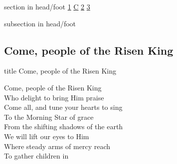 \documentclass{beamer}
\begin{document}
{
{ 
 {
 \begin{beamercolorbox}[ht=4.5ex,dp=1.5ex,%
      leftskip=.3cm,rightskip=.3cm plus1fil]{section in head/foot}
 \fontsize{12}{25}\selectfont 
\hyperlink{Come, people of the Risen King[]1}{1}
\hyperlink{Come, people of the Risen King[]C}{C}
\hyperlink{Come, people of the Risen King[]2}{2}
\hyperlink{Come, people of the Risen King[]3}{3}
 
 \end{beamercolorbox}%
  \begin{beamercolorbox}[ht=2.5ex,dp=1.125ex,%
   leftskip=.3cm,rightskip=.3cm plus1fil]{subsection in head/foot}
   \insertauthor
 \end{beamercolorbox}%
 }
}
\subsection{ Come, people of the Risen King }

\hypertarget{Come, people of the Risen King[]}{}
\begin{frame}{}
 \vfill
  \centering
  \begin{beamercolorbox}[sep=8pt,center,shadow=true,rounded=true]{title}
    Come, people of the Risen King     
  \end{beamercolorbox}
  \vfill
\end{frame}

\hypertarget{Come, people of the Risen King[]1}{}
\begin{frame}{}
\fontsize{ 18 }{ 23 }\selectfont

Come, people of the Risen King\\ 
Who delight to bring Him praise\\ 
Come all, and tune your hearts to sing\\ 
To the Morning Star of grace\\ 
From the shifting shadows of the earth\\ 
We will lift our eyes to Him\\ 
Where steady arms of mercy reach\\ 
To gather children in 

\end{frame}

\hypertarget{Come, people of the Risen King[]C}{}
\begin{frame}{}
\fontsize{ 18 }{ 23 }\selectfont


\end{frame}}
\end{document}
